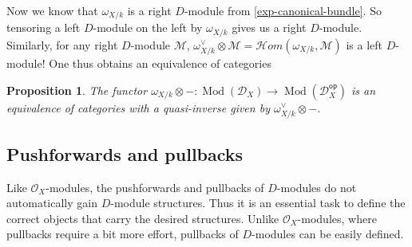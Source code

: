 \documentclass[11pt, a4paper]{article}
\newtheorem{proposition}[theorem]{Proposition}
\theoremstyle{definition}
\newcommand{\w}[0]{\omega}
\newcommand{\op}[0]{\mathsf{op}}
\newcommand{\Mod}{\operatorname{Mod}}
\begin{document}
    Now we know that $\w_{X/k}$ is a right $D$-module from \cref{exp-canonical-bundle}. So tensoring a left $D$-module on the left by $\w_{X/k}$ gives us a right $D$-module. Similarly, for any right $D$-module $\mathcal M$, $\w_{X/k}^\vee\otimes\mathcal M=\mathcal Hom(\w_{X/k},\mathcal M)$ is a left $D$-module! One thus obtains an equivalence of categories
    \begin{proposition}
        The functor $\w_{X/k}\otimes-:\Mod(\mathcal D_X)\to\Mod(\mathcal D_X^\op)$ is an equivalence of categories with a quasi-inverse given by $\w_{X/k}^\vee\otimes-$.
    \end{proposition}

    \subsection{Pushforwards and pullbacks}
    Like $\mathcal O_X$-modules, the pushforwards and pullbacks of $D$-modules do not automatically gain $D$-module structures. Thus it is an essential task to define the correct objects that carry the desired structures. Unlike $\mathcal O_X$-modules, where pullbacks require a bit more effort, pullbacks of $D$-modules can be easily defined. 
    
\end{document}

